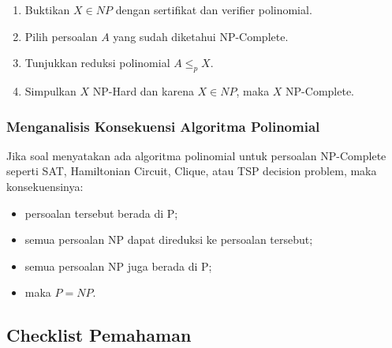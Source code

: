 \begin{enumerate}
    \item Buktikan $X\in NP$ dengan sertifikat dan verifier polinomial.
    \item Pilih persoalan $A$ yang sudah diketahui NP-Complete.
    \item Tunjukkan reduksi polinomial $A\le_p X$.
    \item Simpulkan $X$ NP-Hard dan karena $X\in NP$, maka $X$ NP-Complete.
\end{enumerate}

\subsubsection{Menganalisis Konsekuensi Algoritma Polinomial}

Jika soal menyatakan ada algoritma polinomial untuk persoalan NP-Complete seperti SAT, Hamiltonian Circuit, Clique, atau TSP decision problem, maka konsekuensinya:
\begin{itemize}
    \item persoalan tersebut berada di P;
    \item semua persoalan NP dapat direduksi ke persoalan tersebut;
    \item semua persoalan NP juga berada di P;
    \item maka $P=NP$.
\end{itemize}

\subsection{Checklist Pemahaman}

